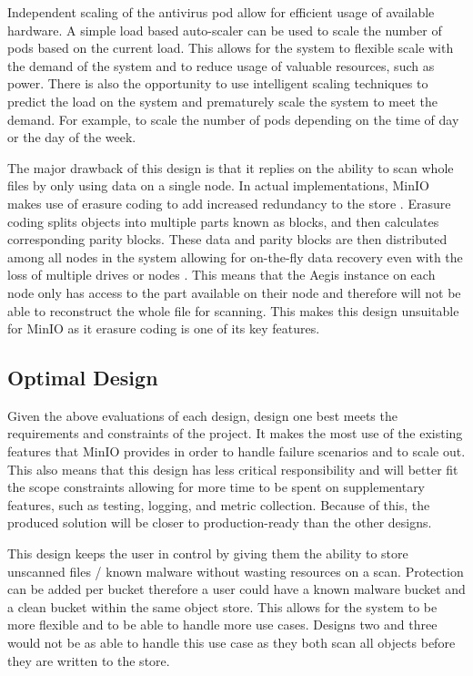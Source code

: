 \documentclass[12pt, conference, final, a4paper, onecolumn, compsoc]{IEEEtran}
\begin{document}
Independent scaling of the antivirus pod allow for efficient usage of available
hardware. A simple load based auto-scaler can be used to scale the number of
pods based on the current load. This allows for the system to flexible scale
with the demand of the system and to reduce usage of valuable resources, such as
power. There is also the opportunity to use intelligent scaling techniques to
predict the load on the system and prematurely scale the system to meet the
demand. For example, to scale the number of pods depending on the time of day or
the day of the week.

The major drawback of this design is that it replies on the ability to scan
whole files by only using data on a single node. In actual implementations,
MinIO makes use of erasure coding to add increased redundancy to the store
\citep{minio-erasure}. Erasure coding splits objects into multiple parts known
as blocks, and then calculates corresponding parity blocks. These data and
parity blocks are then distributed among all nodes in the system allowing for
on-the-fly data recovery even with the loss of multiple drives or nodes . This
means that the Aegis instance on each node only has access to the part available
on their node and therefore will not be able to reconstruct the whole file for
scanning. This makes this design unsuitable for MinIO as it erasure coding is
one of its key features.


\subsection*{Optimal Design}

Given the above evaluations of each design, design one best meets the
requirements and constraints of the project. It makes the most use of the
existing features that MinIO provides in order to handle failure scenarios and
to scale out. This also means that this design has less critical responsibility
and will better fit the scope constraints allowing for more time to be spent on
supplementary features, such as testing, logging, and metric collection. Because
of this, the produced solution will be closer to production-ready than the other
designs.

This design keeps the user in control by giving them the ability to store
unscanned files / known malware without wasting resources on a scan. Protection
can be added per bucket therefore a user could have a known malware bucket and a
clean bucket within the same object store. This allows for the system to be more
flexible and to be able to handle more use cases. Designs two and three would
not be as able to handle this use case as they both scan all objects before they
are written to the store.
\end{document}
